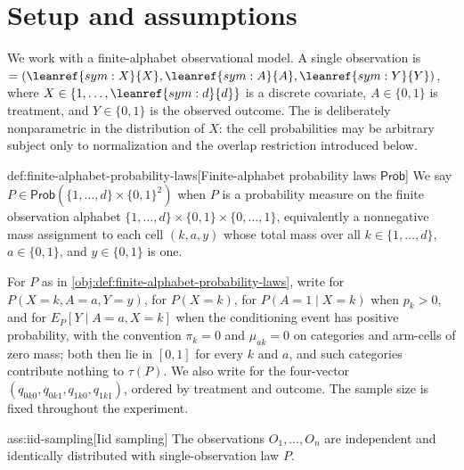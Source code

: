 \section{Setup and assumptions}

We work with a finite-alphabet observational model. A single observation is
\(=(\leanref{sym:X}{\ensuremath{X}},\leanref{sym:A}{\ensuremath{A}},\leanref{sym:Y}{\ensuremath{Y}})\), where \(X\in\{1,\ldots,\leanref{sym:d}{\ensuremath{d}}\}\) is a discrete covariate, \(A\in\{0,1\}\) is treatment, and \(Y\in\{0,1\}\) is the observed outcome. The  is deliberately nonparametric in the distribution of \(X\): the cell probabilities may be arbitrary subject only to normalization and the overlap restriction introduced below.

\begin{definitionv}{def:finite-alphabet-probability-laws}[Finite-alphabet probability laws \(\mathsf{Prob}\)]
We say \(P\in\mathsf{Prob}(\{1,\ldots,d\}\times\{0,1\}^2)\) when \(P\) is a probability measure on the finite observation alphabet \(\{1,\ldots,d\}\times\{0,1\}\times\{0,\ldots,1\}\), equivalently a nonnegative mass assignment to each cell \((k,a,y)\) whose total mass over all \(k\in\{1,\ldots,d\}\), \(a\in\{0,1\}\), and \(y\in\{0,1\}\) is one.
\end{definitionv}

For \(P\) as in \cref{obj:def:finite-alphabet-probability-laws}, write  for \(P(X=k,A=a,Y=y)\),  for \(P(X=k)\),  for \(P(A=1\mid X=k)\) when \(p_k>0\), and  for \(E_P[Y\mid A=a,X=k]\) when the conditioning event has positive probability, with the convention \(\pi_k=0\) and \(\mu_{ak}=0\) on categories and arm-cells of zero mass; both then lie in \([0,1]\) for every \(k\) and \(a\), and such categories contribute nothing to \(\tau(P)\). We also write  for the four-vector \((q_{0k0},q_{0k1},q_{1k0},q_{1k1})\), ordered by treatment and outcome. The sample size  is fixed throughout the experiment.

\begin{assumptionv}{ass:iid-sampling}[Iid sampling]
The observations \(O_1,\ldots,O_n\) are independent and identically distributed with single-observation law \(P\).
\end{assumptionv}

